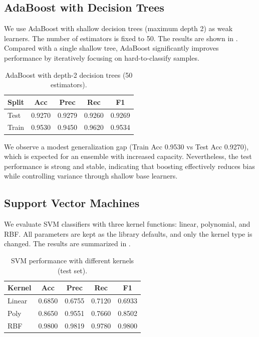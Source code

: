 \documentclass{article}
\begin{document}
\subsection{AdaBoost with Decision Trees}
We use AdaBoost with shallow decision trees (maximum depth 2) as weak learners. The number of estimators is fixed to 50. The results are shown in . Compared with a single shallow tree, AdaBoost significantly improves performance by iteratively focusing on hard-to-classify samples.

\begin{table}[H]
    \centering
    \caption{AdaBoost with depth-2 decision trees (50 estimators).}
    \label{tab:adaboost_results}
    \begin{tabular}{lcccc}
        \toprule
        Split & Acc & Prec & Rec & F1 \\
        \midrule
        Test  & 0.9270 & 0.9279 & 0.9260 & 0.9269 \\
        Train & 0.9530 & 0.9450 & 0.9620 & 0.9534 \\
        \bottomrule
    \end{tabular}
\end{table}

We observe a modest generalization gap (Train Acc 0.9530 vs Test Acc 0.9270), which is expected for an ensemble with increased capacity. Nevertheless, the test performance is strong and stable, indicating that boosting effectively reduces bias while controlling variance through shallow base learners.

\subsection{Support Vector Machines}
We evaluate SVM classifiers with three kernel functions: linear, polynomial, and RBF. All parameters are kept as the library defaults, and only the kernel type is changed. The results are summarized in .

\begin{table}[H]
    \centering
    \caption{SVM performance with different kernels (test set).}
    \label{tab:svm_results}
    \begin{tabular}{lcccc}
        \toprule
        Kernel & Acc & Prec & Rec & F1 \\
        \midrule
        Linear & 0.6850 & 0.6755 & 0.7120 & 0.6933 \\
        Poly   & 0.8650 & 0.9551 & 0.7660 & 0.8502 \\
        RBF    & 0.9800 & 0.9819 & 0.9780 & 0.9800 \\
        \bottomrule
    \end{tabular}
\end{table}
\end{document}
